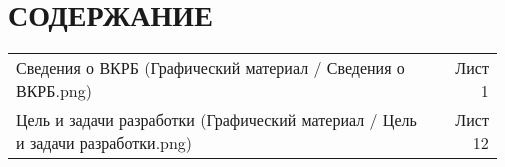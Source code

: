 \section*{СОДЕРЖАНИЕ}
\tableofcontents
\vspace{3pt}
{\parindent0pt
\begin{tabular}{@{}p{0.85\linewidth}r{0.124\linewidth}}
Сведения о ВКРБ (Графический материал / Сведения о ВКРБ.png) & Лист 1\\
Цель и задачи разработки (Графический материал / Цель
и задачи разработки.png) & Лист 12\\
\end{tabular}
}
